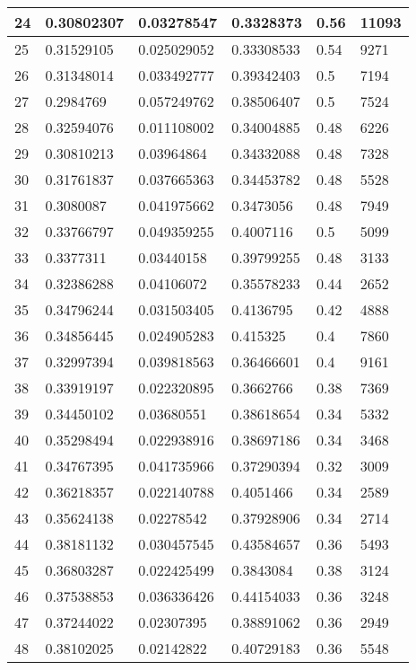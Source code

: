 \begin{longtable}{|l|l|l|l|l|l|}
24 & 0.30802307 & 0.03278547 & 0.3328373 & 0.56 & 11093 \\ \hline 
25 & 0.31529105 & 0.025029052 & 0.33308533 & 0.54 & 9271 \\ \hline 
26 & 0.31348014 & 0.033492777 & 0.39342403 & 0.5 & 7194 \\ \hline 
27 & 0.2984769 & 0.057249762 & 0.38506407 & 0.5 & 7524 \\ \hline 
28 & 0.32594076 & 0.011108002 & 0.34004885 & 0.48 & 6226 \\ \hline 
29 & 0.30810213 & 0.03964864 & 0.34332088 & 0.48 & 7328 \\ \hline 
30 & 0.31761837 & 0.037665363 & 0.34453782 & 0.48 & 5528 \\ \hline 
31 & 0.3080087 & 0.041975662 & 0.3473056 & 0.48 & 7949 \\ \hline 
32 & 0.33766797 & 0.049359255 & 0.4007116 & 0.5 & 5099 \\ \hline 
33 & 0.3377311 & 0.03440158 & 0.39799255 & 0.48 & 3133 \\ \hline 
34 & 0.32386288 & 0.04106072 & 0.35578233 & 0.44 & 2652 \\ \hline 
35 & 0.34796244 & 0.031503405 & 0.4136795 & 0.42 & 4888 \\ \hline 
36 & 0.34856445 & 0.024905283 & 0.415325 & 0.4 & 7860 \\ \hline 
37 & 0.32997394 & 0.039818563 & 0.36466601 & 0.4 & 9161 \\ \hline 
38 & 0.33919197 & 0.022320895 & 0.3662766 & 0.38 & 7369 \\ \hline 
39 & 0.34450102 & 0.03680551 & 0.38618654 & 0.34 & 5332 \\ \hline 
40 & 0.35298494 & 0.022938916 & 0.38697186 & 0.34 & 3468 \\ \hline 
41 & 0.34767395 & 0.041735966 & 0.37290394 & 0.32 & 3009 \\ \hline 
42 & 0.36218357 & 0.022140788 & 0.4051466 & 0.34 & 2589 \\ \hline 
43 & 0.35624138 & 0.02278542 & 0.37928906 & 0.34 & 2714 \\ \hline 
44 & 0.38181132 & 0.030457545 & 0.43584657 & 0.36 & 5493 \\ \hline 
45 & 0.36803287 & 0.022425499 & 0.3843084 & 0.38 & 3124 \\ \hline 
46 & 0.37538853 & 0.036336426 & 0.44154033 & 0.36 & 3248 \\ \hline 
47 & 0.37244022 & 0.02307395 & 0.38891062 & 0.36 & 2949 \\ \hline 
48 & 0.38102025 & 0.02142822 & 0.40729183 & 0.36 & 5548 \\ \hline 

\end{longtable}
